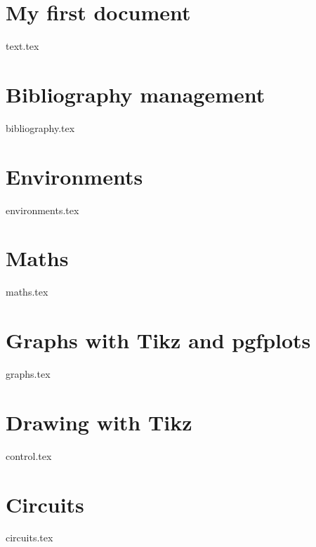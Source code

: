 \section{My first document}
    {text.tex}
\section{Bibliography management}
    {bibliography.tex}
\section{Environments}
    {environments.tex}
\section{Maths}
    {maths.tex}
\section{Graphs with Tikz and pgfplots}
    {graphs.tex}
\section{Drawing with Tikz}
    {control.tex}
\section{Circuits}
        {circuits.tex}